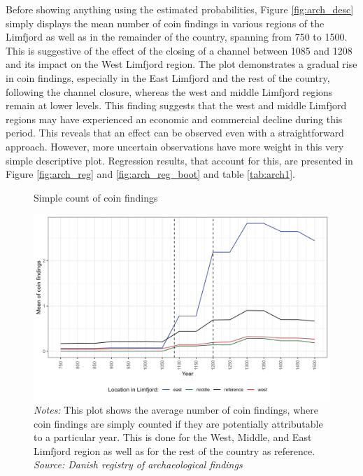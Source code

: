 \documentclass[11pt]{article}
\begin{document}
Before showing anything using the estimated probabilities, Figure \ref{fig:arch_desc} simply displays the mean number of coin findings in various regions of the Limfjord as well as in the remainder of the country, spanning from 750 to 1500. This is suggestive of the effect of the closing of a channel between 1085 and 1208 and its impact on the West Limfjord region. The plot demonstrates a gradual rise in coin findings, especially in the East Limfjord and the rest of the country, following the channel closure, whereas the west and middle Limfjord regions remain at lower levels. This finding suggests that the west and middle Limfjord regions may have experienced an economic and commercial decline during this period. This reveals that an effect can be observed even with a straightforward approach. However, more uncertain observations have more weight in this very simple descriptive plot. Regression results, that account for this, are presented in Figure \ref{fig:arch_reg} and \ref{fig:arch_reg_boot} and table \ref{tab:arch1}.

\begin{figure}
     \centering
     \caption{Simple count of coin findings}\label{fig:arch_desc}
     \includegraphics[width=\textwidth]{Plots/Arch_descriptive.png}
     \parbox{0.9\textwidth}{
     \caption*{\footnotesize \textit{Notes:} This plot shows the average number of coin findings, where coin findings are simply counted if they are potentially attributable to a particular year. This is done for the West, Middle, and East Limfjord region as well as for the rest of the country as reference. \\ \textit{Source: Danish registry of archaeological findings}}
}
     \label{fig:regpops}
\end{figure}
\end{document}
